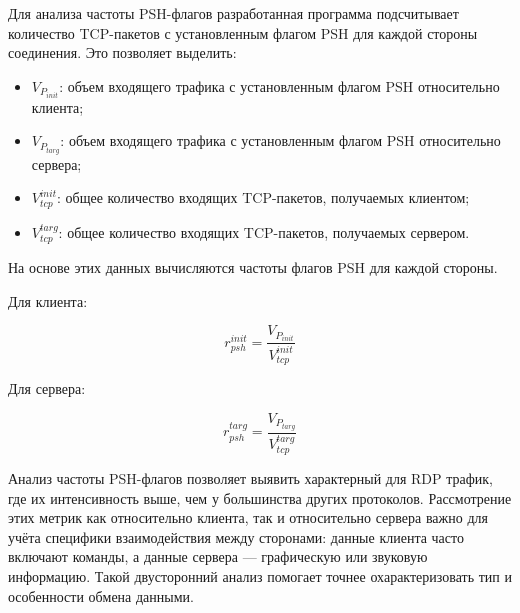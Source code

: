 \documentclass[bachelor, och, coursework]{SCWorks}
\begin{document}


Для анализа частоты PSH-флагов разработанная программа подсчитывает количество TCP-пакетов с установленным флагом PSH для каждой стороны соединения. 
Это позволяет выделить:

\begin{itemize}
  \item $V_{P_{init}}$: объем входящего трафика с установленным флагом PSH относительно клиента;
  \item $V_{P_{targ}}$: объем входящего трафика с установленным флагом PSH относительно сервера;
  \item $V_{tcp}^{init}$: общее количество входящих TCP-пакетов, получаемых клиентом;
  \item $V_{tcp}^{targ}$: общее количество входящих TCP-пакетов, получаемых сервером.
\end{itemize}

На основе этих данных вычисляются частоты флагов PSH для каждой стороны.

Для клиента:

\begin{equation}
  r_{psh}^{init} = \frac{V_{P_{init}}}{V_{tcp}^{init}}
\end{equation}

Для сервера:

\begin{equation}
  r_{psh}^{targ} = \frac{V_{P_{targ}}}{V_{tcp}^{targ}}
\end{equation}

Анализ частоты PSH-флагов позволяет выявить характерный для RDP трафик, где их интенсивность выше, чем у большинства других протоколов. 
Рассмотрение этих метрик как относительно клиента, так и относительно сервера важно для учёта специфики взаимодействия между сторонами: 
данные клиента часто включают команды, а данные сервера — графическую или звуковую информацию. Такой двусторонний анализ помогает точнее 
охарактеризовать тип и особенности обмена данными.
\end{document}
